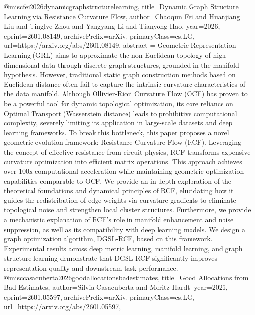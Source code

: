 {}@misc{fei2026dynamicgraphstructurelearning,
      title={Dynamic Graph Structure Learning via Resistance Curvature Flow}, 
      author={Chaoqun Fei and Huanjiang Liu and Tinglve Zhou and Yangyang Li and Tianyong Hao},
      year={2026},
      eprint={2601.08149},
      archivePrefix={arXiv},
      primaryClass={cs.LG},
      url={https://arxiv.org/abs/2601.08149},
      abstract = {Geometric Representation Learning (GRL) aims to approximate the non-Euclidean topology of high-dimensional data through discrete graph structures, grounded in the manifold hypothesis. However, traditional static graph construction methods based on Euclidean distance often fail to capture the intrinsic curvature characteristics of the data manifold. Although Ollivier-Ricci Curvature Flow (OCF) has proven to be a powerful tool for dynamic topological optimization, its core reliance on Optimal Transport (Wasserstein distance) leads to prohibitive computational complexity, severely limiting its application in large-scale datasets and deep learning frameworks. To break this bottleneck, this paper proposes a novel geometric evolution framework: Resistance Curvature Flow (RCF). Leveraging the concept of effective resistance from circuit physics, RCF transforms expensive curvature optimization into efficient matrix operations. This approach achieves over 100x computational acceleration while maintaining geometric optimization capabilities comparable to OCF. We provide an in-depth exploration of the theoretical foundations and dynamical principles of RCF, elucidating how it guides the redistribution of edge weights via curvature gradients to eliminate topological noise and strengthen local cluster structures. Furthermore, we provide a mechanistic explanation of RCF's role in manifold enhancement and noise suppression, as well as its compatibility with deep learning models. We design a graph optimization algorithm, DGSL-RCF, based on this framework. Experimental results across deep metric learning, manifold learning, and graph structure learning demonstrate that DGSL-RCF significantly improves representation quality and downstream task performance.}
}@misc{casacuberta2026goodallocationsbadestimates,
      title={Good Allocations from Bad Estimates}, 
      author={Sílvia Casacuberta and Moritz Hardt},
      year={2026},
      eprint={2601.05597},
      archivePrefix={arXiv},
      primaryClass={cs.LG},
      url={https://arxiv.org/abs/2601.05597},
}
